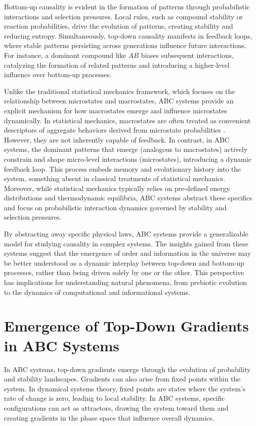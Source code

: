 \documentclass[entropy,article,submit,pdftex,moreauthors]{Definitions/mdpi}
\begin{document}
Bottom-up causality is evident in the formation of patterns through probabilistic interactions and selection pressures. Local rules, such as compound stability or reaction probabilities, drive the evolution of patterns, creating stability and reducing entropy. Simultaneously, top-down causality manifests in feedback loops, where stable patterns persisting across generations influence future interactions. For instance, a dominant compound like \( AB \) biases subsequent interactions, catalyzing the formation of related patterns and introducing a higher-level influence over bottom-up processes.

Unlike the traditional statistical mechanics framework, which focuses on the relationship between microstates and macrostates, ABC systems provide an explicit mechanism for how macrostates emerge and influence microstates dynamically. In statistical mechanics, macrostates are often treated as convenient descriptors of aggregate behaviors derived from microstate probabilities \cite{landau1980statistical}. However, they are not inherently capable of feedback. In contrast, in ABC systems, the dominant patterns that emerge (analogous to macrostates) actively constrain and shape micro-level interactions (microstates), introducing a dynamic feedback loop. This process embeds memory and evolutionary history into the system, something absent in classical treatments of statistical mechanics. Moreover, while statistical mechanics typically relies on pre-defined energy distributions and thermodynamic equilibria, ABC systems abstract these specifics and focus on probabilistic interaction dynamics governed by stability and selection pressures.

By abstracting away specific physical laws, ABC systems provide a generalizable model for studying causality in complex systems. The insights gained from these systems suggest that the emergence of order and information in the universe may be better understood as a dynamic interplay between top-down and bottom-up processes, rather than being driven solely by one or the other. This perspective has implications for understanding natural phenomena, from prebiotic evolution to the dynamics of computational and informational systems.

\section{Emergence of Top-Down Gradients in ABC Systems}

In ABC systems, top-down gradients emerge through the evolution of probability and stability landscapes. Gradients can also arise from fixed points within the system. In dynamical systems theory, fixed points are states where the system's rate of change is zero, leading to local stability. In ABC systems, specific configurations can act as attractors, drawing the system toward them and creating gradients in the phase space that influence overall dynamics.
\end{document}
